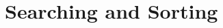 % 

% 

% 

% 

% 

\chapter{Searching and Sorting}
\thispagestyle{chapterstart}
\pagestyle{otherpages}
\label{chapter-searching-sorting}
\setcounter{excounter}{1}


% 

